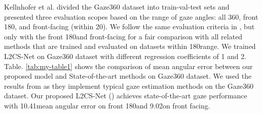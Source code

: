 \documentclass{article}
\begin{document}
\begin{table}[t]
\caption{Comparison of mean angular error between our proposed model and SOTA methods on Gaze360 dataset}
\label{tab:my-table1}
\end{table}



Kellnhofer et al. \cite{Gaze360} divided the Gaze360 dataset into train-val-test sets and presented three evaluation scopes based on the range of gaze angles: all 360\degree, front 180\degree, and front-facing (within 20\degree). We follow the same evaluation criteria in \cite{Gaze360}, but only with the front 180\degree and front-facing for a fair comparison with all related methods that are trained and evaluated on datasets within 180\degree range. We trained L2CS-Net on Gaze360 dataset with different regression coefficients of 1 and 2. Table. \ref{tab:my-table1} shows the comparison of mean angular error between our proposed model and State-of-the-art methods on Gaze360 dataset. We used the results from \cite{survey} as they implement typical gaze estimation methods on the Gaze360 dataset. Our proposed L2CS-Net () achieves state-of-the-art gaze performance with 10.41\degree mean angular error on front 180\degree and 9.02\degree on front facing. 
\end{document}

